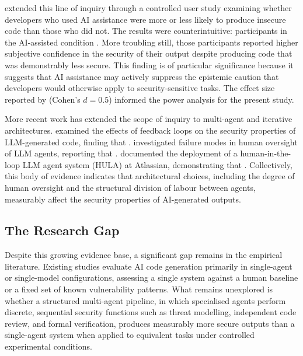 \documentclass[11pt, a4paper]{article}
\begin{document}
\citet{perry2023} extended this line of inquiry through a controlled user study examining whether developers who used AI assistance were more or less likely to produce insecure code than those who did not. The results were counterintuitive: participants in the AI-assisted condition \citep[Perry et al. 2023 -- insert specific finding on insecure code rates or security scores]{perry2023}. More troubling still, those participants reported higher subjective confidence in the security of their output despite producing code that was demonstrably less secure. This finding is of particular significance because it suggests that AI assistance may actively suppress the epistemic caution that developers would otherwise apply to security-sensitive tasks. The effect size reported by \citet{perry2023} (Cohen's $d = 0.5$) informed the power analysis for the present study.

More recent work has extended the scope of inquiry to multi-agent and iterative architectures. \citet{shukla2025} examined the effects of feedback loops on the security properties of LLM-generated code, finding that \citep[Shukla et al. 2025 -- insert specific finding on security degradation or improvement under iterative feedback]{shukla2025}. \citet{kennedy2025} investigated failure modes in human oversight of LLM agents, reporting that \citep[Kennedy et al. 2025 -- insert key finding on oversight failure rates or conditions under which oversight fails]{kennedy2025}. \citet{takerngsaksiri2025} documented the deployment of a human-in-the-loop LLM agent system (HULA) at Atlassian, demonstrating that \citep[Takerngsaksiri et al. 2025 -- insert key empirical finding on human oversight outcomes in production]{takerngsaksiri2025}. Collectively, this body of evidence indicates that architectural choices, including the degree of human oversight and the structural division of labour between agents, measurably affect the security properties of AI-generated outputs.

\subsection*{The Research Gap}

Despite this growing evidence base, a significant gap remains in the empirical literature. Existing studies evaluate AI code generation primarily in single-agent or single-model configurations, assessing a single system against a human baseline or a fixed set of known vulnerability patterns. What remains unexplored is whether a structured multi-agent pipeline, in which specialised agents perform discrete, sequential security functions such as threat modelling, independent code review, and formal verification, produces measurably more secure outputs than a single-agent system when applied to equivalent tasks under controlled experimental conditions.
\end{document}
